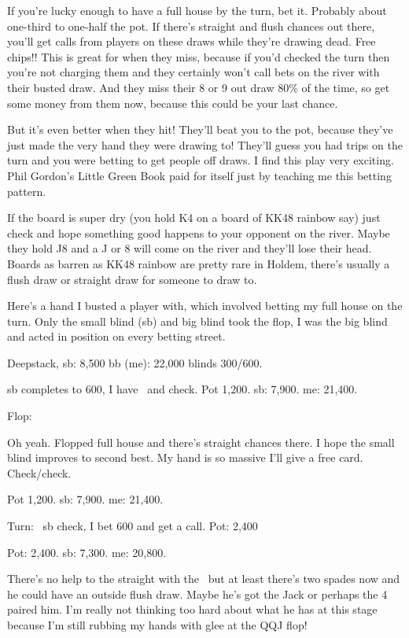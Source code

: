 If you're lucky enough to have a full house by the turn, bet it.
Probably about one-third to one-half the pot. If there's straight
and flush chances out there, you'll get calls from players on 
these draws while they're drawing dead. Free chips!! This is great for when 
they miss, because if you'd checked the turn then you're not charging them and 
they certainly won't call bets on the river with their busted draw.
And they miss their 8 or 9 out draw 80\% of the time, so get some money 
from them now, because this could be your last chance.

But it's even better when they hit! They'll beat you to the pot, because
they've just made the very hand they were drawing to! They'll guess
you had trips on the turn and you were betting to get people off draws.
I find this play very exciting. Phil Gordon's
Little Green Book paid for itself just by teaching me this betting pattern.

If the board is super dry (you hold K4 on a board
of KK48 rainbow say) just check and hope something good happens
to your opponent on the river. Maybe they hold J8 and a J or 8 will come
on the river and they'll lose their head. Boards as barren as KK48 rainbow
are pretty rare in Holdem, there's usually a flush draw or straight draw
for someone to draw to.

Here's a hand I busted a player with, which involved betting my full
house on the turn. Only the small blind (sb) and big blind took the flop,
I was the big blind and acted in position on every betting
street.

Deepstack, sb: 8,500 bb (me): 22,000 blinds 300/600.

sb completes to 600, I have \Qc\Jh\ and check. 
Pot 1,200. sb: 7,900. me: 21,400.

Flop: \Qs\Qh\Jd

Oh yeah. Flopped full house and there's straight chances there. I hope
the small blind improves to second best. My hand is so massive I'll give
a free card. Check/check.

Pot 1,200. sb: 7,900. me: 21,400.

Turn: \fours\ sb check, I bet 600 and get a call. Pot: 2,400

Pot: 2,400. sb: 7,300. me: 20,800.

There's no help to the straight with the \fours\ but at least there's
two spades now and he could have an outside flush draw. Maybe he's
got the Jack or perhaps the 4 paired him. I'm really not thinking
too hard about what he has at this stage because I'm still rubbing my
hands with glee at the QQJ flop!

